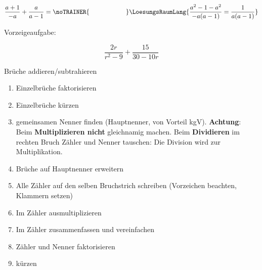 \begin{beispiel}{}{}
$$\frac{a+1}{-a} + \frac{a}{a-1} = \noTRAINER{\hspace{2cm}}\LoesungsRaumLang{ \frac{a^2 - 1 - a^2}{-a(a-1)} = \frac{1}{a(a-1)}}$$
\end{beispiel}

\TNTeop{}%
\newpage

Vorzeigeaufgabe:

$$\frac{2r}{r^2-9} + \frac{15}{30-10r}$$


\begin{rezept}{Brüche addieren/subtrahieren}{}
\begin{enumerate}
	\item Einzelbrüche faktorisieren
	\item Einzelbrüche kürzen
	\item gemeinsamen Nenner finden (Hauptnenner, von Vorteil
	kgV). \textbf{Achtung}: Beim \textbf{Multiplizieren nicht}
	gleichnamig machen. Beim \textbf{Dividieren} im rechten Bruch Zähler
	und Nenner tauschen: Die Division wird zur Multiplikation.
	\item Brüche auf Hauptnenner erweitern
	\item Alle Zähler auf den selben Bruchstrich schreiben (Vorzeichen beachten, Klammern setzen)
	\item Im Zähler ausmultiplizieren
	\item Im Zähler zusammenfassen und vereinfachen
	\item Zähler und Nenner faktorisieren
	\item kürzen
\end{enumerate}
\end{rezept}


